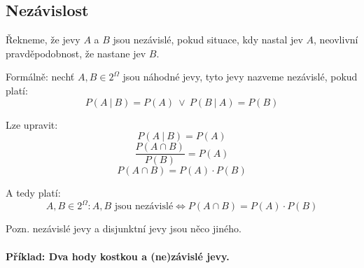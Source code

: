 \subsection{Nezávislost}

\begin{compactitem}
    \item Řekneme, že jevy $A$ a $B$ jsou nezávislé, pokud situace, kdy nastal jev $A$, neovlivní pravděpodobnost, že nastane jev $B$.

    \item Formálně: nechť $A, B \in 2^{\Omega}$ jsou náhodné jevy, tyto jevy nazveme nezávislé, pokud platí:
    $$ P(A ~|~ B) = P(A) ~\lor~ P(B ~|~ A) = P(B)$$

    \item Lze upravit:
    $$ P(A ~|~ B) = P(A) $$
    $$ \frac{P(A \cap B)}{P(B)} = P(A) $$
    $$ P(A \cap B) = P(A) \cdot P(B) $$

    \item A tedy platí:
    $$ A, B \in 2^{\Omega} : A, B \text{ jsou nezávislé} \Leftrightarrow P(A \cap B) = P(A) \cdot P(B) $$

    \item Pozn. nezávislé jevy a disjunktní jevy jsou něco jiného.
\end{compactitem}

\paragraph*{Příklad: Dva hody kostkou a (ne)závislé jevy.}

